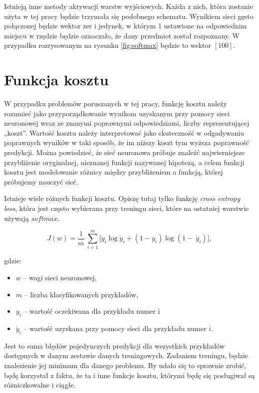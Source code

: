 Istnieją inne metody aktywacji warstw wyjściowych. Każda z nich, która zostanie użyta w tej pracy będzie trzymała się podobnego schematu. Wynikiem sieci gęsto połączonej będzie wektor zer i jedynek, w którym 1 ustawione na odpowiednim miejscu w rzędzie będzie oznaczało, że dany przedmiot został rozpoznany. W przypadku rozrysowanym na rysunku \ref{fig:softmax} będzie to wektor \([1 0 0]\).

\section{Funkcja kosztu}
\label{sec:costfunction}

W przypadku problemów poruszanych w tej pracy, funkcję kosztu należy rozumieć jako przyporządkowanie wynikom uzyskanym przy pomocy sieci neuronowej wraz ze znanymi poprawnymi odpowiedziami, liczby reprezentującej „koszt”. Wartość kosztu należy interpretować jako skuteczność w odgadywaniu poprawnych wyników w taki sposób, że im niższy koszt tym wyższa poprawność predykcji. Można powiedzieć, że sieć neuronowa próbuje znaleźć najwierniejsze przybliżenie oryginalnej, nieznanej funkcji nazywanej hipotezą, a celem funkcji kosztu jest modelowanie różnicy między przybliżeniem a funkcją, której próbujemy nauczyć sieć.

Istnieje wiele różnych funkcji kosztu. Opiszę tutaj tylko funkcję \textit{cross entropy loss}, która jest często wybierana przy treningu sieci, które na ostatniej warstwie używają \(softmax\).

\[J(w) = \frac{1}{m}\ \sum_{i = 1}^{m}{\lbrack y_{i}\log{\acute{y}_{i} + \left( 1 - y_{i} \right)\log{(1 - \ \acute{y}_{i})}}\rbrack},\]

gdzie:

\begin{itemize}
\item
  \(w\) -- wagi sieci neuronowej,
\item
  \(m\) -- liczba klasyfikowanych przykładów,
\item
  \(y_{i}\) -- wartość oczekiwana dla przykładu numer i
\item
    \(\acute{y}_{i}\) -- wartość uzyskana przy pomocy sieci dla przykładu numer \(i\).
\end{itemize}

Jest to suma błędów pojedynczych predykcji dla wszystkich przykładów dostępnych w danym zestawie danych treningowych. Zadaniem treningu, będzie znalezienie jej minimum dla danego problemu.
By udało się to sprawnie zrobić, będę korzystał z faktu, że ta i inne funkcje kosztu, którymi będę się posługiwał są różniczkowalne i ciągłe.

